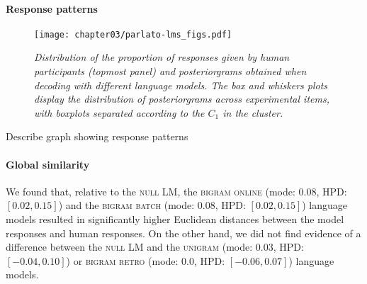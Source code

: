 

\paragraph{Response patterns}
\begin{figure}[htb!]
    \centering
    \texttt{[image: chapter03/parlato-lms\_figs.pdf]}
    \caption{\textit{Distribution of the proportion of responses given by human participants (topmost panel) and posteriorgrams obtained when decoding with different language models. The box and whiskers plots display the distribution of posteriorgrams across experimental items, with boxplots separated according to the $C_{1}$ in the cluster.}}
    \label{fig:parlato-lms}
  \end{figure}

{\color{red}Describe graph showing response patterns}

\paragraph{Global similarity}
We found that, relative to the \textsc{null} LM, the \textsc{bigram online} (mode: $0.08$, HPD: $[0.02, 0.15]$) and the \textsc{bigram batch} (mode: $0.08$, HPD: $[0.02, 0.15]$) language models resulted in significantly higher Euclidean distances between the model responses and human responses. On the other hand, we did not find evidence of a difference between the \textsc{null} LM and the \textsc{unigram} (mode: $0.03$, HPD: $[-0.04, 0.10]$) or \textsc{bigram retro} (mode: $0.0$, HPD: $[-0.06, 0.07]$) language models.


